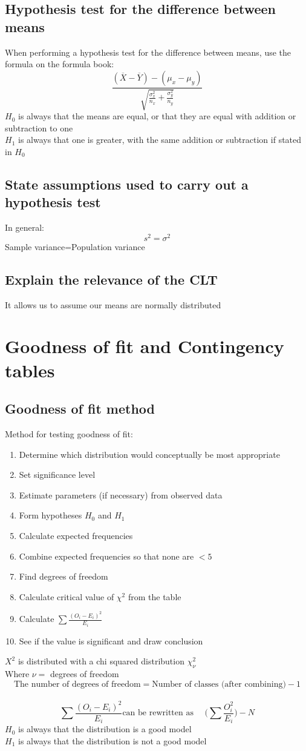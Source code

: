 \documentclass{article}[18pt]
\begin{document}
\subsection{Hypothesis test for the difference between means} 
When performing a hypothesis test for the difference between means, use the formula on the formula book:
$$\frac{(\overline{X}-\overline{Y})-(\mu_x-\mu_y)}{\sqrt{\frac{\sigma^2_x}{n_x}+\frac{\sigma^2_y}{n_y}}}$$
$H_0$ is always that the means are equal, or that they are equal with addition or subtraction to one\\
$H_1$ is always that one is greater, with the same addition or subtraction if stated in $H_0$
\subsection{State assumptions used to carry out a hypothesis test}
In general:
$$s^2=\sigma^2$$
Sample variance=Population variance
\subsection{Explain the relevance of the CLT}
It allows us to assume our means are normally distributed
\newpage
\section{Goodness of fit and Contingency tables}
\subsection{Goodness of fit method}
Method for testing goodness of fit:
\begin{enumerate}
\item Determine which distribution would conceptually be most appropriate
\item Set significance level
\item Estimate parameters (if necessary) from observed data
\item Form hypotheses $H_0$ and $H_1$
\item Calculate expected frequencies
\item Combine expected frequencies so that none are $<5$
\item Find degrees of freedom
\item Calculate critical value of $\chi^2$ from the table
\item Calculate $\sum\frac{(O_i-E_i)^2}{E_i}$
\item See if the value is significant and draw conclusion
\end{enumerate}
$X^2$ is distributed with a chi squared distribution $\chi^2_\nu$\\
Where $\nu=$ degrees of freedom\\
$$\textrm{The number of degrees of freedom}=\textrm{Number of classes (after combining)}-1$$
\\
$$\sum\frac{(O_i-E_i)^2}{E_i} \textrm{can be rewritten as  } \quad \Bigg(\sum\frac{O^2_i}{E_i}\Bigg)-N$$
$H_0$ is always that the distribution is a good model\\
$H_1$ is always that the distribution is not a good model
\end{document}
